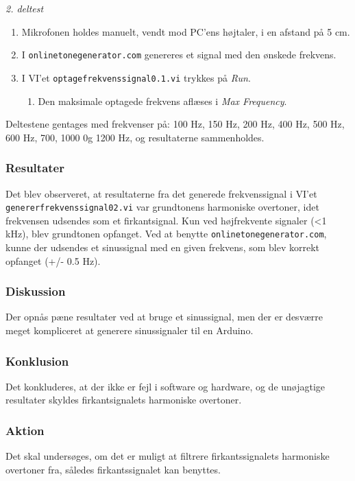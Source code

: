 			
			\textit{2. deltest}			
			\begin{enumerate}
				\item Mikrofonen holdes manuelt, vendt mod PC'ens højtaler, i en afstand på 5 cm. 
				\item I \texttt{onlinetonegenerator.com} genereres et signal med den ønskede frekvens. 
				\item I VI'et \texttt{optagefrekvenssignal0.1.vi} trykkes på \textit{Run}. 
					\begin{enumerate}
						\item Den maksimale optagede frekvens aflæses i \textit{Max Frequency}. 
					\end{enumerate}	  
			\end{enumerate}
		
			Deltestene gentages med frekvenser på: 100 Hz, 150 Hz, 200 Hz, 400 Hz, 500 Hz, 600 Hz, 700, 1000 0g 1200 Hz, og resultaterne sammenholdes. 
			
			\subsubsection{Resultater}
			 Det blev observeret, at resultaterne fra det generede frekvenssignal i VI'et \texttt{genererfrekvenssignal02.vi} var grundtonens harmoniske overtoner, idet frekvensen udsendes som et firkantsignal. Kun ved højfrekvente signaler (<1 kHz), blev grundtonen opfanget. 
			 Ved at benytte \texttt{onlinetonegenerator.com}, kunne der udsendes et sinussignal med en given frekvens, som blev korrekt opfanget (+/- 0.5 Hz).     
			\subsubsection{Diskussion}
			Der opnås pæne resultater ved at bruge et sinussignal, men der er desværre meget kompliceret at generere sinussignaler til en Arduino.   
			\subsubsection{Konklusion}
			Det konkluderes, at der ikke er fejl i software og hardware, og de unøjagtige resultater skyldes firkantsignalets harmoniske overtoner.  
			\subsubsection{Aktion}
			Det skal undersøges, om det er muligt at filtrere firkantssignalets harmoniske overtoner fra, således firkantssignalet kan benyttes. 
		
